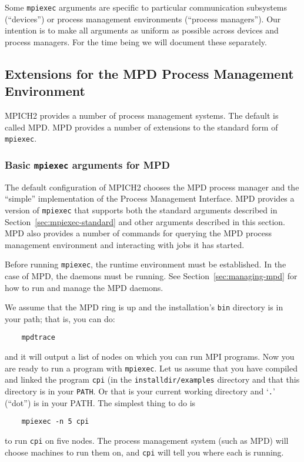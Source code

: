 \documentclass[dvipdfm,11pt]{article}
\begin{document}
Some \texttt{mpiexec} arguments are specific to particular communication
subsystems (``devices'') or process management environments (``process
managers'').  Our intention is to make all arguments as uniform as
possible across devices and process managers.  For the time being we
will document these separately.

\subsection{Extensions for the MPD Process Management Environment}
\label{sec:extensions-various}

MPICH2 provides a number of process management systems.  The default is
called MPD.  MPD provides a number of extensions to the standard form of
\texttt{mpiexec}.

\subsubsection{Basic \texttt{mpiexec} arguments for MPD}
\label{sec:extensions-mpd}

The default configuration of MPICH2 chooses the MPD process manager and
the ``simple'' implementation of the Process Management Interface.
MPD provides a version of
\texttt{mpiexec} that supports both the standard arguments described in
Section~\ref{sec:mpiexec-standard} and other arguments described in this
section.  MPD also provides a number of commands for querying the MPD
process management environment and interacting with jobs it has started. 

Before running \texttt{mpiexec}, the runtime environment must be
established.  In the case of MPD, the daemons must be running.  See
Section~\ref{sec:managing-mpd} for how to run and manage the MPD daemons.

We assume that the MPD ring is up and the installation's \texttt{bin}
directory is in your path; that is, you can do:
\begin{verbatim}
    mpdtrace
\end{verbatim}
and it will output a list of nodes on which you can run MPI programs.
Now you are ready to run a program with \texttt{mpiexec}.  Let us assume
that you have compiled and linked the program \texttt{cpi} (in the
\texttt{installdir/examples} directory and that this directory is in your
\texttt{PATH}.  Or that is your current working directory and
`\texttt{.}' (``dot'') is in your PATH.   The simplest thing to do is
\begin{verbatim}
    mpiexec -n 5 cpi
\end{verbatim}
to run \texttt{cpi} on five nodes.  The process management system (such
as MPD) will choose machines to run them on, and \texttt{cpi} will tell
you where each is running.  
\end{document}
